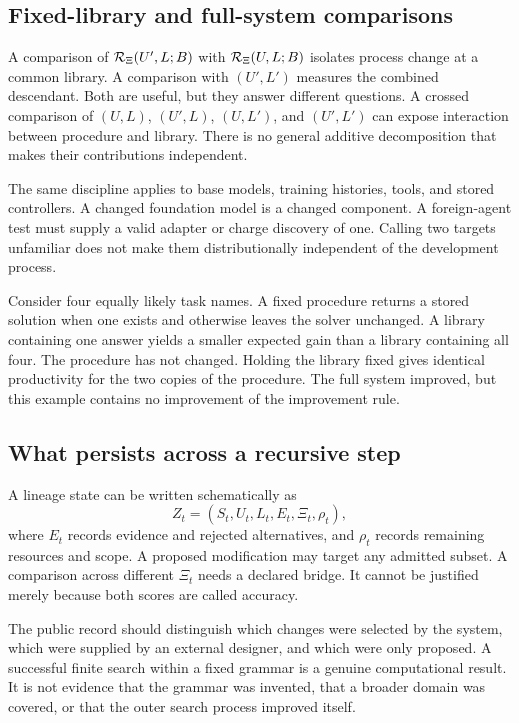 \subsection{Fixed-library and full-system comparisons}
A comparison of $\mathcal R_\Xi(U',L;B)$ with $\mathcal R_\Xi(U,L;B)$ isolates process change at a common library. A comparison with $(U',L')$ measures the combined descendant. Both are useful, but they answer different questions. A crossed comparison of $(U,L)$, $(U',L)$, $(U,L')$, and $(U',L')$ can expose interaction between procedure and library. There is no general additive decomposition that makes their contributions independent.

The same discipline applies to base models, training histories, tools, and stored controllers. A changed foundation model is a changed component. A foreign-agent test must supply a valid adapter or charge discovery of one. Calling two targets unfamiliar does not make them distributionally independent of the development process.

\begin{SIIcounterexample}\label{SII:ex:library}
Consider four equally likely task names. A fixed procedure returns a stored solution when one exists and otherwise leaves the solver unchanged. A library containing one answer yields a smaller expected gain than a library containing all four. The procedure has not changed. Holding the library fixed gives identical productivity for the two copies of the procedure. The full system improved, but this example contains no improvement of the improvement rule.
\end{SIIcounterexample}

\subsection{What persists across a recursive step}
A lineage state can be written schematically as
\[
Z_t=(S_t,U_t,L_t,E_t,\Xi_t,\rho_t),
\]
where $E_t$ records evidence and rejected alternatives, and $\rho_t$ records remaining resources and scope. A proposed modification may target any admitted subset. A comparison across different $\Xi_t$ needs a declared bridge. It cannot be justified merely because both scores are called accuracy.

The public record should distinguish which changes were selected by the system, which were supplied by an external designer, and which were only proposed. A successful finite search within a fixed grammar is a genuine computational result. It is not evidence that the grammar was invented, that a broader domain was covered, or that the outer search process improved itself.

